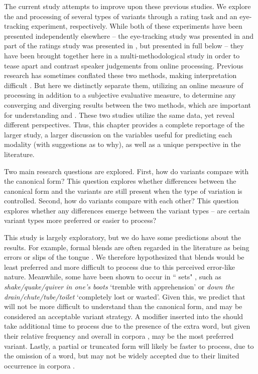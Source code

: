 \documentclass[output=paper
,modfonts
,nonflat]{langsci/langscibook}
\begin{document}
The current study attempts to improve upon these previous studies. We explore the  and processing  of several types of  variants  through a rating task and an eye-tracking experiment, respectively. While both of these experiments have been presented independently elsewhere -- the eye-tracking study was presented in \citet{GeeraertEtAl2017b} and part of the  ratings study was presented in \citet{GeeraertEtAl2017}, but presented in full below -- they have been brought together here in a multi-methodological study  in order to tease apart and contrast speaker judgements from online processing. Previous research has sometimes conflated these two methods, making interpretation difficult \citep[cf.][]{GibbsEtAl1989, GibbsNayak1989}. But here we distinctly separate them, utilizing an online measure of processing in addition to a subjective evaluative measure, to determine any converging and diverging results between the two methods, which are important for understanding  and . These two studies utilize the same data, yet reveal different perspectives. Thus, this chapter provides a complete reportage of the larger study, a larger discussion on the variables useful for predicting each modality (with suggestions as to why), as well as a unique perspective in the  literature.

Two main research questions are explored. First, how do variants compare with the canonical form? This question explores whether differences between the canonical form and the variants are still present when the type of variation is controlled. Second, how do variants compare with each other? This question explores whether any differences emerge between the variant types -- are certain variant types more preferred or easier to process?

This study is largely exploratory, but we do have some predictions about the results. For example, formal  blends  are often regarded in the literature as being errors or slips of the tongue \citep{Fay1982, CuttingBock1997}. We therefore hypothesized that blends would be least preferred and more difficult to process due to this perceived error-like nature. Meanwhile, some  have been shown to occur in `` sets" \citep{Moon1998}, such as \textit{shake/quake/quiver in one's boots} `tremble with apprehension' or \textit{down the drain/chute/tube/toilet} `completely lost or wasted'. Given this, we predict that  will not be more difficult to understand  than the canonical form, and may be considered an acceptable  variant strategy.  A modifier inserted into the   should take additional time to process due to the presence of the extra word, but given their relative frequency and overall  in corpora \citep{Moon1998, Schroder2013}, may be the most preferred variant. Lastly, a partial or truncated form  will likely be faster to process, due to the omission of a word, but may not be widely accepted due to their limited occurrence in corpora \citep{Moon1998}.
\end{document}
